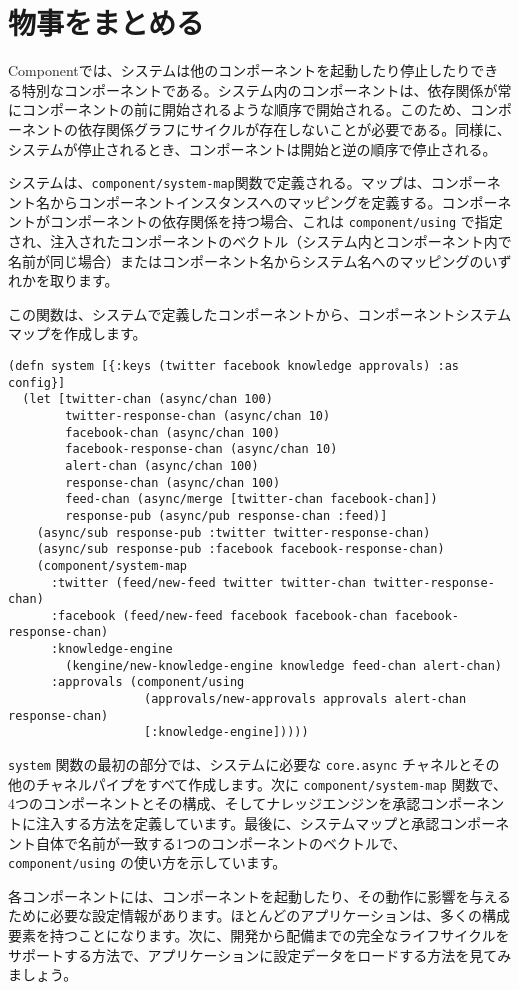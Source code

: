 \section{物事をまとめる}

Componentでは、システムは他のコンポーネントを起動したり停止したりできる特別なコンポーネントである。システム内のコンポーネントは、依存関係が常にコンポーネントの前に開始されるような順序で開始される。このため、コンポーネントの依存関係グラフにサイクルが存在しないことが必要である。同様に、システムが停止されるとき、コンポーネントは開始と逆の順序で停止される。

システムは、\texttt{component/system-map}関数で定義される。マップは、コンポーネント名からコンポーネントインスタンスへのマッピングを定義する。コンポーネントがコンポーネントの依存関係を持つ場合、これは \texttt{component/using} で指定され、注入されたコンポーネントのベクトル（システム内とコンポーネント内で名前が同じ場合）またはコンポーネント名からシステム名へのマッピングのいずれかを取ります。

この関数は、システムで定義したコンポーネントから、コンポーネントシステムマップを作成します。

\begin{lstlisting}[numbers=none]
(defn system [{:keys (twitter facebook knowledge approvals) :as config}]
  (let [twitter-chan (async/chan 100)
        twitter-response-chan (async/chan 10)
        facebook-chan (async/chan 100)
        facebook-response-chan (async/chan 10)
        alert-chan (async/chan 100)
        response-chan (async/chan 100)
        feed-chan (async/merge [twitter-chan facebook-chan])
        response-pub (async/pub response-chan :feed)]
    (async/sub response-pub :twitter twitter-response-chan)
    (async/sub response-pub :facebook facebook-response-chan)
    (component/system-map
      :twitter (feed/new-feed twitter twitter-chan twitter-response-chan)
      :facebook (feed/new-feed facebook facebook-chan facebook-response-chan)
      :knowledge-engine
        (kengine/new-knowledge-engine knowledge feed-chan alert-chan)
      :approvals (component/using
                   (approvals/new-approvals approvals alert-chan response-chan)
                   [:knowledge-engine]))))
\end{lstlisting}

\texttt{system} 関数の最初の部分では、システムに必要な \texttt{core.async} チャネルとその他のチャネルパイプをすべて作成します。次に \texttt{component/system-map} 関数で、4つのコンポーネントとその構成、そしてナレッジエンジンを承認コンポーネントに注入する方法を定義しています。最後に、システムマップと承認コンポーネント自体で名前が一致する1つのコンポーネントのベクトルで、 \texttt{component/using} の使い方を示しています。

各コンポーネントには、コンポーネントを起動したり、その動作に影響を与えるために必要な設定情報があります。ほとんどのアプリケーションは、多くの構成要素を持つことになります。次に、開発から配備までの完全なライフサイクルをサポートする方法で、アプリケーションに設定データをロードする方法を見てみましょう。







